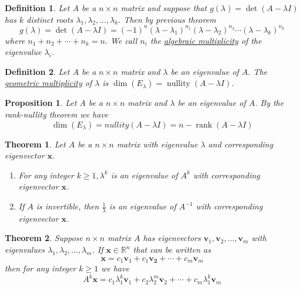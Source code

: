 \documentclass{article}
\theoremstyle{definitionstyle}
\newtheorem{definition}{Definition}[section]
\newtheorem{theorem}{Theorem}[section]
\newtheorem{proposition}{Proposition}[section]
\begin{document}
\begin{definition}
    Let $A$ be a $n \times n$ matrix and suppose that $g(\lambda)=\det(A-\lambda I)$ has $k$ distinct
    roots $\lambda_1,\lambda_2,\dots,\lambda_k$. Then by previous theorem
    \begin{equation*}
        g(\lambda)=\det(A-\lambda I)={(-1)}^n{(\lambda-\lambda_1)}^{n_1}{(\lambda-\lambda_2)}^{n_2}\cdots{(\lambda-\lambda_k)}^{n_k}
    \end{equation*}
    where $n_1+n_2+\cdots+n_k=n$. We call $n_i$ the \underline{algebraic multiplicity} of the eigenvalue $\lambda_i$.
\end{definition}

\begin{definition}
    Let $A$ be a $n \times n$ matrix and $\lambda$ be an eigenvalue of $A$. The \underline{geometric multiplicity} of $\lambda$ 
    is $\dim(E_\lambda)=\operatorname*{nullity}(A-\lambda I)$.
\end{definition}

\begin{proposition}
    Let $A$ be a $n \times n$ matrix and $\lambda$ be an eigenvalue of $A$. By the rank-nullity theorem we have
    \begin{equation*}
        \dim(E_\lambda)=nullity(A-\lambda I)=n-\operatorname*{rank}(A-\lambda I)
    \end{equation*}
\end{proposition}

\begin{theorem}
    Let $A$ be a $n \times n$ matrix with eigenvalue $\lambda$ and corresponding eigenvector $\mathbf{x}$.
    \begin{enumerate}
        \item For any integer $k \ge 1, \lambda^k$ is an eigenvalue of $A^k$ with corresponding eigenvector $\mathbf{x}$.
        \item If $A$ is invertible, then $\frac{1}{\lambda}$ is an eigenvalue of $A^{-1}$ with corresponding eigenvector $\mathbf{x}$.
    \end{enumerate}
\end{theorem}

\begin{theorem}
    Suppose $n \times n$ matrix $A$ has eigenvectors $\mathbf{v}_1,\mathbf{v}_2,\dots,\mathbf{v}_m$ 
    with eigenvalues $\lambda_1,\lambda_2,\dots,\lambda_m$. If $\mathbf{x} \in \mathbb{R}^n$ that can be written as
    \begin{equation}
        \mathbf{x}=c_1\mathbf{v}_1+c_1\mathbf{v_2}+\cdots+c_m\mathbf{v}_m
    \end{equation}
    then for any integer $k \ge 1$ we have
    \begin{equation}
        A^k\mathbf{x}=c_1\lambda_1^k\mathbf{v}_1+c_2\lambda_2^m\mathbf{v}_2+\cdots+c_m\lambda_1^k\mathbf{v}_m
    \end{equation}
\end{theorem}
\end{document}
